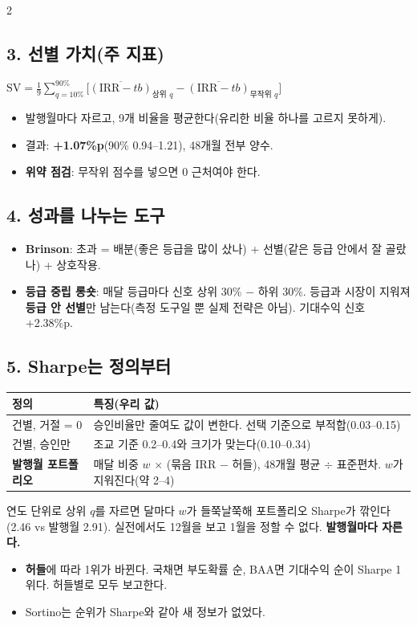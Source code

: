 \documentclass[10pt]{report}
\begin{document}
\begin{multicols}{2}
\subsection*{3. 선별 가치(주 지표)}
\begin{formulabox}
$\mathrm{SV}=\frac19\sum_{q=10\%}^{90\%}\big[\overline{(\mathrm{IRR}-tb)}_{\text{상위 }q}-\overline{(\mathrm{IRR}-tb)}_{\text{무작위 }q}\big]$
\end{formulabox}
\begin{itemize}
\item 발행월마다 자르고, 9개 비율을 평균한다(유리한 비율 하나를 고르지 못하게).
\item 결과: \textbf{+1.07\%p}(90\% 0.94--1.21), 48개월 전부 양수.
\item \textbf{위약 점검}: 무작위 점수를 넣으면 0 근처여야 한다.
\end{itemize}

\subsection*{4. 성과를 나누는 도구}
\begin{itemize}
\item \textbf{Brinson}: 초과 = 배분(좋은 등급을 많이 샀나) + 선별(같은 등급 안에서 잘 골랐나) + 상호작용.
\item \textbf{등급 중립 롱숏}: 매달 등급마다 신호 상위 30\% $-$ 하위 30\%. 등급과 시장이 지워져 \textbf{등급 안 선별}만 남는다(측정 도구일 뿐 실제 전략은 아님). 기대수익 신호 +2.38\%p.
\end{itemize}

\subsection*{5. Sharpe는 정의부터}
\begin{tabularx}{\linewidth}{@{}p{24mm}X@{}}\toprule
정의 & 특징(우리 값)\\\midrule
건별, 거절 = 0 & 승인비율만 줄여도 값이 변한다. 선택 기준으로 부적합(0.03--0.15)\\
건별, 승인만 & 조교 기준 0.2--0.4와 크기가 맞는다(0.10--0.34)\\
\textbf{발행월 포트폴리오} & 매달 비중 $w$ \ensuremath{\times} (묶음 IRR $-$ 허들), 48개월 평균 \ensuremath{\div} 표준편차. $w$가 지워진다(약 2--4)\\\bottomrule
\end{tabularx}
\begin{warnbox}[자르는 단위]
연도 단위로 상위 $q$를 자르면 달마다 $w$가 들쭉날쭉해 포트폴리오 Sharpe가 깎인다(2.46 vs 발행월 2.91). 실전에서도 12월을 보고 1월을 정할 수 없다. \textbf{발행월마다 자른다.}
\end{warnbox}
\begin{itemize}
\item \textbf{허들}에 따라 1위가 바뀐다. 국채면 부도확률 순, BAA면 기대수익 순이 Sharpe 1위다. 허들별로 모두 보고한다.
\item Sortino는 순위가 Sharpe와 같아 새 정보가 없었다.
\end{itemize}


\end{multicols}
\end{document}
